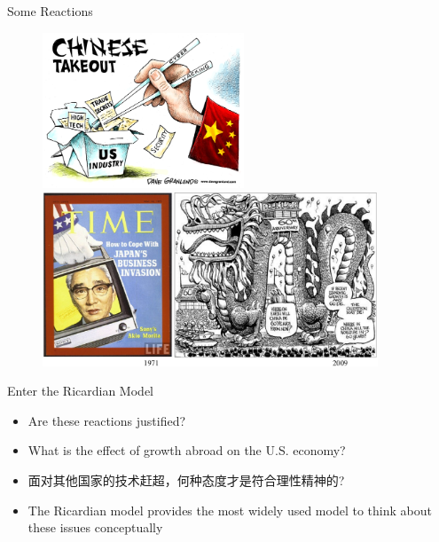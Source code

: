 \documentclass[10pt,hyperref={CJKbookmarks=true},xcolor=dvipsnames,aspectratio=169]{beamer}
\begin{document}
\begin{frame}{Some Reactions }


\begin{figure}

\centering{}\includegraphics[width=6cm]{fig/ricardo/lec3-010}
\centering{}\includegraphics[width=10cm]{fig/ricardo/lec3-01}
\end{figure}

\end{frame}

\begin{frame}{Enter the Ricardian Model }

\begin{itemize}
\item Are these reactions justified? 
\item What is the effect of growth abroad on the U.S. economy? 
\item 面对其他国家的技术赶超，何种态度才是符合理性精神的? 
 
\item The Ricardian model provides the most widely used model to think about
these issues conceptually
\end{itemize}
\end{frame}
\end{document}

